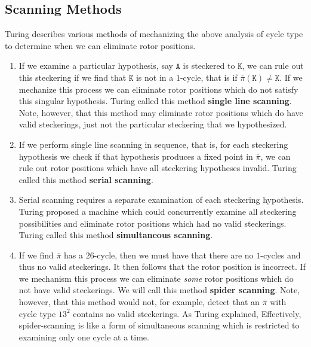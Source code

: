 \subsection{Scanning Methods}
Turing describes various methods of mechanizing the above analysis of
cycle type to determine when we can eliminate rotor positions.
\begin{enumerate}
  \item If we examine a particular hypothesis, say $\texttt{A}$ is steckered
    to $\texttt{K}$, we can rule out this steckering if we find that
    $\texttt{K}$ is
    not in a $1$-cycle, that is if $\overline\pi(\texttt{K}) \ne
    \texttt{K}$. If we
    mechanize this process we can eliminate rotor positions which do
    not satisfy this singular hypothesis. Turing called this method
    \textbf{single line scanning}. Note, however, that this method
    may eliminate rotor
    positions which do have valid steckerings, just not the
    particular steckering that we hypothesized.
  \item If we perform single line scanning in sequence, that is, for
    each steckering hypothesis we check if that hypothesis produces a
    fixed point in $\overline\pi$, we can rule out rotor positions which
    have all steckering hypotheses invalid. Turing called this method
    \textbf{serial scanning}.
  \item Serial scanning requires a separate examination of each
    steckering hypothesis. Turing proposed a machine which could concurrently
    examine all steckering possibilities and eliminate rotor positions
    which had no valid steckerings. Turing called this method
    \textbf{simultaneous scanning}.
  \item If we find $\overline\pi$ has a $26$-cycle, then we must
    have that there are no $1$-cycles and thus no valid steckerings.
    It then follows that the rotor position is incorrect.
    If we mechanism this process we can eliminate \emph{some} rotor
    positions which do not have valid steckerings. We will call this
    method \textbf{spider scanning}. Note, however, that this method
    would not, for example, detect that an $\overline\pi$ with cycle
    type ${13}^2$ contains no
    valid steckerings. As Turing explained,
     Effectively, spider-scanning is like a form of
    simultaneous scanning which is restricted
    to examining only one cycle at a time.
\end{enumerate}

